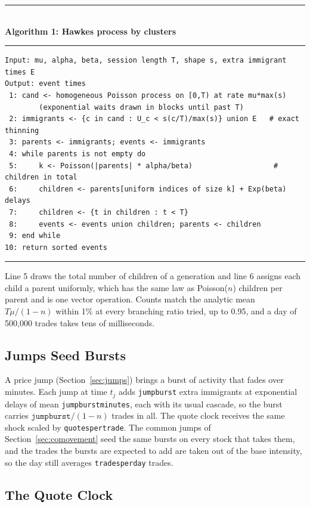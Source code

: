 \documentclass[11pt,a4paper]{article}
\newcommand{\key}[1]{\texttt{#1}}
\theoremstyle{paper}
\begin{document}
\medskip
\noindent\rule{\linewidth}{0.8pt}\\
\textbf{Algorithm 1: Hawkes process by clusters}\\[-6pt]
\rule{\linewidth}{0.4pt}
\begin{small}
\begin{verbatim}
Input: mu, alpha, beta, session length T, shape s, extra immigrant times E
Output: event times
 1: cand <- homogeneous Poisson process on [0,T) at rate mu*max(s)
        (exponential waits drawn in blocks until past T)
 2: immigrants <- {c in cand : U_c < s(c/T)/max(s)} union E   # exact thinning
 3: parents <- immigrants; events <- immigrants
 4: while parents is not empty do
 5:     k <- Poisson(|parents| * alpha/beta)                   # children in total
 6:     children <- parents[uniform indices of size k] + Exp(beta) delays
 7:     children <- {t in children : t < T}
 8:     events <- events union children; parents <- children
 9: end while
10: return sorted events
\end{verbatim}
\end{small}
\vspace{-8pt}
\noindent\rule{\linewidth}{0.8pt}

Line 5 draws the total number of children of a generation and line 6 assigns each child a parent uniformly, which has the same law as Poisson($n$) children per parent and is one vector operation. Counts match the analytic mean $T\mu/(1-n)$ within 1\% at every branching ratio tried, up to 0.95, and a day of 500,000 trades takes tens of milliseconds.

\subsection{Jumps Seed Bursts}\label{sec:bursts}

A price jump (Section~\ref{sec:jumps}) brings a burst of activity that fades over minutes. Each jump at time $t_j$ adds \key{jumpburst} extra immigrants at exponential delays of mean \key{jumpburstminutes}, each with its usual cascade, so the burst carries $\key{jumpburst}/(1-n)$ trades in all. The quote clock receives the same shock scaled by \key{quotespertrade}. The common jumps of Section~\ref{sec:comovement} seed the same bursts on every stock that takes them, and the trades the bursts are expected to add are taken out of the base intensity, so the day still averages \key{tradesperday} trades.

\subsection{The Quote Clock}
\end{document}

